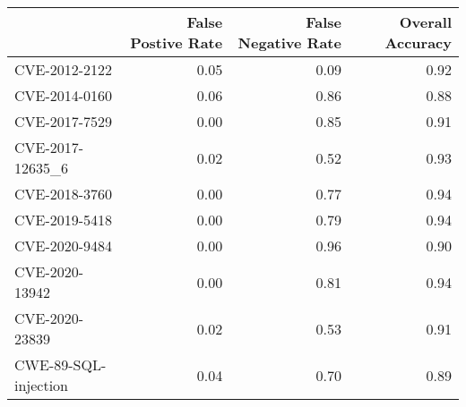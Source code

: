 \begin{tabular}{lrrr}
\toprule
{} &  False Postive Rate &  False Negative Rate &  Overall Accuracy \\
\midrule
CVE-2012-2122        &                0.05 &                 0.09 &              0.92 \\
CVE-2014-0160        &                0.06 &                 0.86 &              0.88 \\
CVE-2017-7529        &                0.00 &                 0.85 &              0.91 \\
CVE-2017-12635\_6     &                0.02 &                 0.52 &              0.93 \\
CVE-2018-3760        &                0.00 &                 0.77 &              0.94 \\
CVE-2019-5418        &                0.00 &                 0.79 &              0.94 \\
CVE-2020-9484        &                0.00 &                 0.96 &              0.90 \\
CVE-2020-13942       &                0.00 &                 0.81 &              0.94 \\
CVE-2020-23839       &                0.02 &                 0.53 &              0.91 \\
CWE-89-SQL-injection &                0.04 &                 0.70 &              0.89 \\
\bottomrule
\end{tabular}
